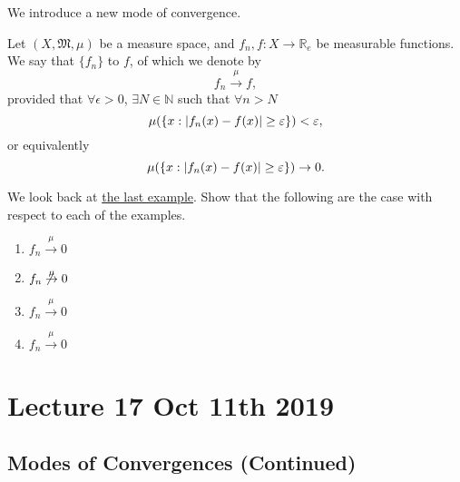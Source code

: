 \documentclass[notoc,notitlepage]{tufte-book}
\newcommand{\convmeas}{\overset{\mu}{\to}}
\begin{document}
We introduce a new mode of convergence.

\begin{defn}\label{defn:convergence_in_measure}
  Let $(X, \mathfrak{M}, \mu)$ be a measure space, and
  $f_n, f : X \to \mathbb{R}_e$ be measurable functions.
  We say that $\{ f_n \}$  to $f$,
  of which we denote by
  \begin{equation*}
    f_n \convmeas f,
  \end{equation*}
  provided that $\forall \epsilon > 0$, $\exists N \in \mathbb{N}$
  such that $\forall n > N$
  \begin{equation*}
    \mu(\{ x : \left|f_n(x) - f(x)\right| \geq \varepsilon \}) < \varepsilon,
  \end{equation*}
  or equivalently
  \begin{equation*}
    \mu(\{ x : \left|f_n(x) - f(x)\right| \geq \varepsilon \}) \to 0.
  \end{equation*}
\end{defn}

\begin{ex}
  We look back at \hyperref[item:eg1_mode_of_conv]{the last example}.
  Show that the following are the case with respect to each of the examples.
  \begin{enumerate}
    \item $f_n \convmeas 0$
    \item $f_n \not\convmeas 0$
    \item $f_n \convmeas 0$
    \item $f_n \convmeas 0$
  \end{enumerate}
\end{ex}



\chapter{Lecture 17 Oct 11th 2019}%
\label{chp:lecture_17_oct_11th_2019}

\section{Modes of Convergences (Continued)}%
\label{sec:modes_of_convergences_continued}
\end{document}
